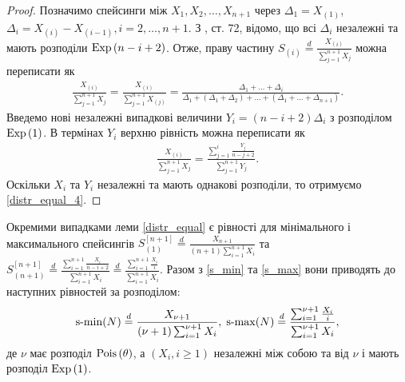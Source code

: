\begin{proof}
    Позначимо спейсинги між $X_1, X_2, \dots, X_{n+1}$ через
    $\Delta_1 = X_{(1)}$,
    $\Delta_i = X_{(i)} - X_{(i-1)}, i=2, \dots, n+1$. З \cite{Arnold_et_al_2008}, ст. 72, відомо, що
    всі $\Delta_i$ незалежні та мають розподіли $\mathrm{Exp}\left(n-i+2\right)$.
    Отже, праву частину $S_{(i)} \overset{d}{=} \frac{X_{(i)}}{\sum_{j=1}^{n+1}X_j}$
    можна переписати як
    \begin{gather*}
        \frac{X_{(i)}}{\sum_{j=1}^{n+1}X_j} = 
        \frac{X_{(i)}}{\sum_{j=1}^{n+1}X_{(j)}} = 
        \frac{
            \Delta_1 + \dots + \Delta_i
        }{
            \Delta_1 + \left(\Delta_1 + \Delta_2\right) +
            \dots + \left(\Delta_1 + \dots + \Delta_{n+1}\right)
        }.
    \end{gather*}
    Введемо нові незалежні випадкові величини
    $Y_i = (n-i+2)\Delta_i$ з розподілом
    $\mathrm{Exp}\left(1\right)$. В термінах $Y_i$
    верхню рівність можна переписати як
    \begin{gather*}
        \frac{X_{(i)}}{\sum_{j=1}^{n+1}X_j} = 
        \frac{
            \sum_{j=1}^i \frac{Y_j}{n-j+2} 
        }{
            \sum_{j=1}^{n+1} Y_j
        }.
    \end{gather*}
    Оскільки $X_i$ та $Y_i$ незалежні та мають однакові розподіли, то отримуємо \eqref{distr_equal_4}.
\end{proof}

Окремими випадками леми \ref{distr_equal}
є рівності для мінімального і максимального спейсингів
$S_{(1)}^{[n+1]} \overset{d}{=} \frac{X_{n+1}}{(n+1)\sum_{i=1}^{n+1} X_i}$
та $S_{(n+1)}^{[n+1]} \overset{d}{=} \frac{\sum_{i=1}^{n+1} \frac{X_i}{n-i+2}}{\sum_{i=1}^{n+1} X_i}
\overset{d}{=} \frac{\sum_{i=1}^{n+1} \frac{X_i}{i}}{\sum_{i=1}^{n+1} X_i}$.
Разом з \eqref{s_min} та \eqref{s_max}
вони приводять до наступних рівностей за розподілом:
\begin{gather}\label{distr_equal_5}
    \operatorname{s-min}(N) \overset{d}{=}
    \frac{X_{\nu+1}}{(\nu+1)\sum_{i=1}^{\nu+1} X_i} , \;
    \operatorname{s-max}(N) \overset{d}{=} 
    \frac{\sum_{i=1}^{\nu+1} \frac{X_i}{i}}{\sum_{i=1}^{\nu+1} X_i},
\end{gather}
де $\nu$ має розподіл $\mathrm{Pois}\left(\theta\right)$, а $\left(X_i, i\geq 1\right)$ незалежні між собою та від $\nu$ 
і мають розподіл $\mathrm{Exp}\left(1\right)$.


